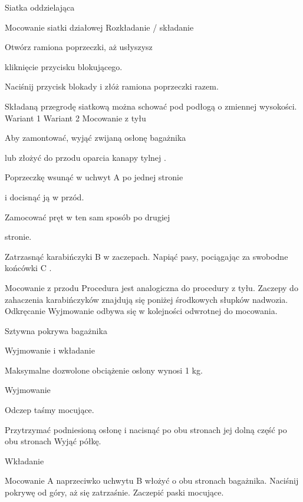 Siatka oddzielająca

Mocowanie siatki działowej
Rozkładanie / składanie
\begin{itemizeArrow}
	\itemArrow Otwórz ramiona poprzeczki, aż usłyszysz
\end{itemizeArrow}
kliknięcie przycisku
blokującego.
\begin{itemizeArrow}
	\itemArrow Naciśnij przycisk blokady i złóż ramiona poprzeczki razem.
\end{itemizeArrow}
Składaną przegrodę siatkową można schować
pod podłogą o zmiennej wysokości.
Wariant 1
Wariant 2
Mocowanie z tyłu
\begin{itemizeArrow}
	\itemArrow Aby zamontować, wyjąć zwijaną osłonę bagażnika
\end{itemizeArrow}
lub złożyć do przodu oparcia kanapy tylnej .
\begin{itemizeArrow}
	\itemArrow Poprzeczkę wsunąć w uchwyt A po jednej stronie
\end{itemizeArrow}
i docisnąć ją w przód.
\begin{itemizeArrow}
	\itemArrow Zamocować pręt w ten sam sposób po drugiej
\end{itemizeArrow}
stronie.
\begin{itemizeArrow}
	\itemArrow Zatrzasnąć karabińczyki B w zaczepach.
	\itemArrow Napiąć pasy, pociągając za swobodne końcówki C .
\end{itemizeArrow}
Mocowanie z przodu
Procedura jest analogiczna do procedury z tyłu.
Zaczepy do zahaczenia karabińczyków znajdują się
poniżej środkowych słupków nadwozia.
Odkręcanie
Wyjmowanie odbywa się w kolejności odwrotnej do
mocowania.


Sztywna pokrywa bagażnika

Wyjmowanie i wkładanie

Maksymalne dozwolone obciążenie osłony wynosi 1 kg.

Wyjmowanie
\begin{itemizeArrow}
	\itemArrow Odczep taśmy mocujące.
\end{itemizeArrow}

\begin{itemizeArrow}
	\itemArrow Przytrzymać podniesioną osłonę i nacisnąć po obu stronach jej dolną część po obu stronach
	\itemArrow Wyjąć półkę.
\end{itemizeArrow}

Wkładanie
\begin{itemizeArrow}
	\itemArrow Mocowanie A naprzeciwko uchwytu B włożyć o obu stronach bagażnika.
	\itemArrow Naciśnij pokrywę od góry, aż się zatrzaśnie.
	\itemArrow Zaczepić paski mocujące.
\end{itemizeArrow}

